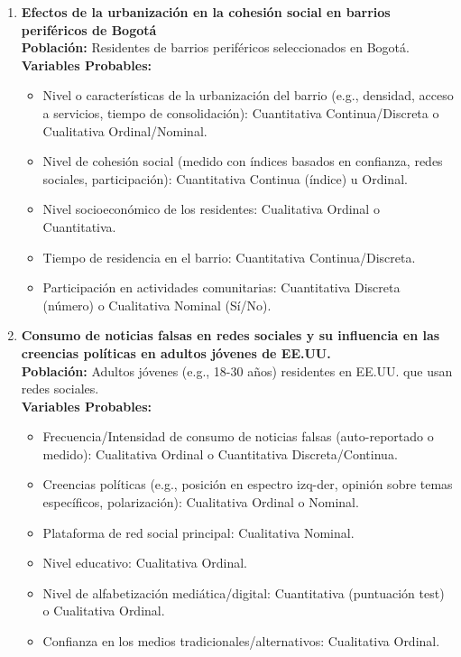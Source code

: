 \documentclass[12pt, letterpaper]{article}
\begin{document}
\begin{enumerate}
\item \textbf{Efectos de la urbanización en la cohesión social en barrios periféricos de Bogotá} \\
\textbf{Población:} Residentes de barrios periféricos seleccionados en Bogotá. \\
\textbf{Variables Probables:}
\begin{itemize}
  \item Nivel o características de la urbanización del barrio (e.g., densidad, acceso a servicios, tiempo de consolidación): Cuantitativa Continua/Discreta o Cualitativa Ordinal/Nominal.
  \item Nivel de cohesión social (medido con índices basados en confianza, redes sociales, participación): Cuantitativa Continua (índice) u Ordinal.
  \item Nivel socioeconómico de los residentes: Cualitativa Ordinal o Cuantitativa.
  \item Tiempo de residencia en el barrio: Cuantitativa Continua/Discreta.
  \item Participación en actividades comunitarias: Cuantitativa Discreta (número) o Cualitativa Nominal (Sí/No).
\end{itemize}

\item \textbf{Consumo de noticias falsas en redes sociales y su influencia en las creencias políticas en adultos jóvenes de EE.UU.} \\
\textbf{Población:} Adultos jóvenes (e.g., 18-30 años) residentes en EE.UU. que usan redes sociales. \\
\textbf{Variables Probables:}
\begin{itemize}
  \item Frecuencia/Intensidad de consumo de noticias falsas (auto-reportado o medido): Cualitativa Ordinal o Cuantitativa Discreta/Continua.
  \item Creencias políticas (e.g., posición en espectro izq-der, opinión sobre temas específicos, polarización): Cualitativa Ordinal o Nominal.
  \item Plataforma de red social principal: Cualitativa Nominal.
  \item Nivel educativo: Cualitativa Ordinal.
  \item Nivel de alfabetización mediática/digital: Cuantitativa (puntuación test) o Cualitativa Ordinal.
  \item Confianza en los medios tradicionales/alternativos: Cualitativa Ordinal.
\end{itemize}



\end{enumerate}
\end{document}
